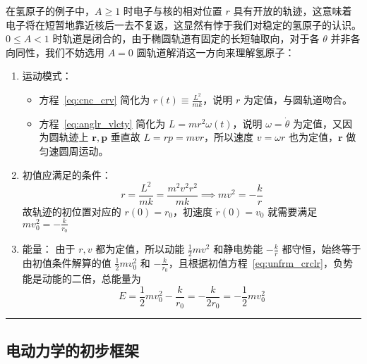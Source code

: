 \documentclass[cn,10pt,math=newtx,citestyle=gb7714-2015,bibstyle=gb7714-2015]{elegantbook}
\def\bm{\boldsymbol}
\def\srule{\noindent\rule{\linewidth}{0.3mm}}
\begin{document}
\begin{instance}[圆轨道氢原子的求解]
在氢原子的例子中，$A\ge 1$ 时电子与核的相对位置 $r$ 具有开放的轨迹，这意味着电子将在短暂地靠近核后一去不复返，这显然有悖于我们对稳定的氢原子的认识。$0\le A<1$ 时轨道是闭合的，由于椭圆轨道有固定的长短轴取向，对于各 $\theta$ 并非各向同性，我们不妨选用 $A=0$ 圆轨道解消这一方向来理解氢原子：
\begin{enumerate}
    \item 运动模式：
    \begin{itemize}
        \item 方程~\ref{eq:cnc_crv} 简化为 $r(t)\equiv\frac{L^2}{mk}$，说明 $r$ 为定值，与圆轨道吻合。
        \item 方程~\ref{eq:anglr_vlcty} 简化为 $L=mr^2\omega(t)$，说明 $\omega=\dot{\theta}$ 为定值，又因为圆轨迹上 $\bm r,\bm p$ 垂直故 $L=rp=mvr$，所以速度 $v=\omega r$ 也为定值，$\bm r$ 做匀速圆周运动。
    \end{itemize}
    \item 初值应满足的条件：
\begin{equation}\label{eq:unfrm_crclr}
    r=\frac{L^2}{mk}=\frac{m^2v^2r^2}{mk}\implies mv^2=-\frac{k}{r}
\end{equation}
故轨迹的初位置对应的 $r(0)=r_0$，初速度 $\dot{r}(0)=v_0$ 就需要满足 $mv_0^2=-\frac{k}{r_0}$
    \item 能量：
    由于 $r,v$ 都为定值，所以动能 $\frac{1}{2}mv^2$ 和静电势能 $-\frac{k}{r}$ 都守恒，始终等于由初值条件解算的值 $\frac{1}{2}mv_0^2$ 和 $-\frac{k}{r_0}$，且根据初值方程~\ref{eq:unfrm_crclr}，负势能是动能的二倍，总能量为
    \begin{equation*}
        E=\frac{1}{2}mv_0^2-\frac{k}{r_0}=-\frac{k}{2r_0}=-\frac{1}{2}mv_0^2
    \end{equation*}
\end{enumerate}
\end{instance}
\srule


\subsection{电动力学的初步框架}
\end{document}
